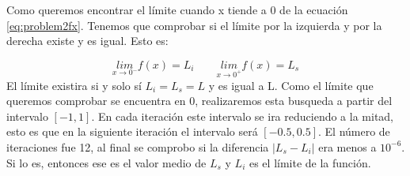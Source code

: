 Como queremos encontrar el límite cuando x tiende a 0 de la ecuación \ref{eq:problem2fx}. Tenemos que comprobar si el límite por la izquierda y por la derecha existe y es igual. Esto es:

\begin{equation*}
    \underset{x\rightarrow 0^-}{lim} f(x) = L_i
    \qquad
    \underset{x\rightarrow 0^+}{lim} f(x) = L_s
\end{equation*}
El límite existira si y solo sí $L_i=L_s=L$ y es igual a L. Como el límite que queremos comprobar se encuentra en 0, realizaremos esta busqueda a partir del intervalo $[-1,1]$. En cada iteración este intervalo se ira reduciendo a la mitad, esto es que en la siguiente iteración el intervalo será $[-0.5,0.5]$. El número de iteraciones fue 12, al final se comprobo si la diferencia $|L_s-L_i|$ era menos a $10^{-6}$. Si lo es, entonces ese es el valor medio de $L_s$ y $L_i$ es el límite de la función.


